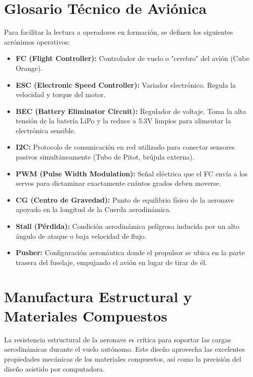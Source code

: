 \documentclass[11pt,a4paper]{article}
\begin{document}
\section{Glosario Técnico de Aviónica}
Para facilitar la lectura a operadores en formación, se definen los siguientes acrónimos operativos:
\begin{itemize}[itemsep=1ex]
    \item \textbf{FC (Flight Controller):} Controlador de vuelo o "cerebro" del avión (Cube Orange).
    \item \textbf{ESC (Electronic Speed Controller):} Variador electrónico. Regula la velocidad y torque del motor.
    \item \textbf{BEC (Battery Eliminator Circuit):} Regulador de voltaje. Toma la alta tensión de la batería LiPo y la reduce a 5.3V limpios para alimentar la electrónica sensible.
    \item \textbf{I2C:} Protocolo de comunicación en red utilizado para conectar sensores pasivos simultáneamente (Tubo de Pitot, brújula externa).
    \item \textbf{PWM (Pulse Width Modulation):} Señal eléctrica que el FC envía a los servos para dictaminar exactamente cuántos grados deben moverse.
    \item \textbf{CG (Centro de Gravedad):} Punto de equilibrio físico de la aeronave apoyado en la longitud de la Cuerda aerodinámica.
    \item \textbf{Stall (Pérdida):} Condición aerodinámica peligrosa inducida por un alto ángulo de ataque o baja velocidad de flujo.
    \item \textbf{Pusher:} Configuración aeronáutica donde el propulsor se ubica en la parte trasera del fuselaje, empujando el avión en lugar de tirar de él.
\end{itemize}

\section{Manufactura Estructural y Materiales Compuestos}
La resistencia estructural de la aeronave es crítica para soportar las cargas aerodinámicas durante el vuelo autónomo. Este diseño aprovecha las excelentes propiedades mecánicas de los materiales compuestos, así como la precisión del diseño asistido por computadora.
\end{document}
